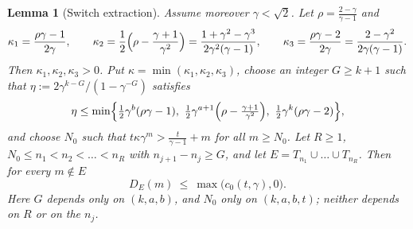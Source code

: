\documentclass[11pt]{amsart}
\newtheorem{lemma}{Lemma}[section]
\theoremstyle{definition}
\theoremstyle{remark}
\begin{document}
\begin{lemma}[Switch extraction]\label{lem:extract}
Assume moreover $\gamma<\sqrt2$. Let $\rho=\frac{2-\gamma}{\gamma-1}$ and
\[
  \kappa_1=\frac{\rho\gamma-1}{2\gamma},\qquad
  \kappa_2=\frac12\Bigl(\rho-\frac{\gamma+1}{\gamma^2}\Bigr)=\frac{1+\gamma^2-\gamma^3}{2\gamma^2(\gamma-1)},\qquad
  \kappa_3=\frac{\rho\gamma-2}{2\gamma}=\frac{2-\gamma^2}{2\gamma(\gamma-1)} .
\]
Then $\kappa_1,\kappa_2,\kappa_3>0$. Put $\kappa=\min(\kappa_1,\kappa_2,\kappa_3)$, choose an
integer $G\ge k+1$ such that $\eta:=2\gamma^{k-G}/(1-\gamma^{-G})$ satisfies
\begin{equation}\label{eq:eta}
  \eta\le\min\Bigl\{\tfrac12\gamma^{b}(\rho\gamma-1),\ \tfrac12\gamma^{a+1}\Bigl(\rho-\tfrac{\gamma+1}{\gamma^2}\Bigr),\ \tfrac12\gamma^{k}(\rho\gamma-2)\Bigr\},
\end{equation}
and choose $N_0$ such that $t\kappa\gamma^m>\frac t{\gamma-1}+m$ for all $m\ge N_0$. Let $R\ge1$,
$N_0\le n_1<n_2<\dots<n_R$ with $n_{j+1}-n_j\ge G$, and let $E=T_{n_1}\cup\dots\cup T_{n_R}$.
Then for every $m\notin E$
\[
  D_E(m)\ \le\ \max\bigl(c_0(t,\gamma),0\bigr).
\]
Here $G$ depends only on $(k,a,b)$, and $N_0$ only on $(k,a,b,t)$; neither depends on $R$ or on
the $n_j$.
\end{lemma}
\end{document}
